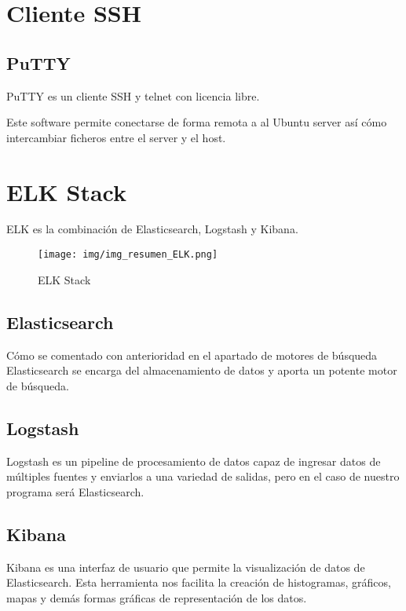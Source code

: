 \section{Cliente SSH}
\subsection{PuTTY}
PuTTY es un cliente SSH  y telnet con licencia libre.

Este software permite conectarse de forma remota a al Ubuntu server así cómo intercambiar ficheros entre el server y el host.

\section{ELK Stack}
ELK es la combinación de Elasticsearch, Logstash y Kibana.

\begin{figure}[h]
	\centering
	\texttt{[image: img/img\_resumen\_ELK.png]}
	\caption{ELK Stack}
	\label{img_resumen_ELK}
\end{figure}

\subsection{Elasticsearch}
Cómo se comentado con anterioridad en el apartado de motores de búsqueda Elasticsearch se encarga del almacenamiento de datos y aporta un potente motor de búsqueda.

\subsection{Logstash}
Logstash es un pipeline de procesamiento de datos capaz de ingresar datos de múltiples fuentes y enviarlos a una variedad de salidas, pero en el caso de nuestro programa será Elasticsearch.

\subsection{Kibana}
Kibana es una interfaz de usuario que permite la visualización de datos de Elasticsearch. Esta herramienta nos facilita la creación de histogramas, gráficos, mapas y demás formas gráficas de representación de los datos.